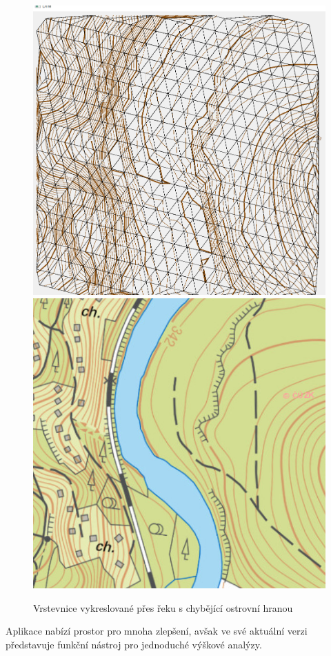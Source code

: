 \documentclass[11pt]{article}
\begin{document}
\begin{figure}[htbh]
	\centering
	\includegraphics[scale=0.23]{images/chyba_reka.png}
	\includegraphics[scale=0.35]{images/chyba_reka_zm.png}
	\caption{Vrstevnice vykreslované přes řeku s chybějící ostrovní hranou}	
	\label{fig:reka}
\end{figure} 

Aplikace nabízí prostor pro mnoha zlepšení, avšak ve své aktuální verzi představuje funkční nástroj pro jednoduché výškové analýzy. 
\end{document}
